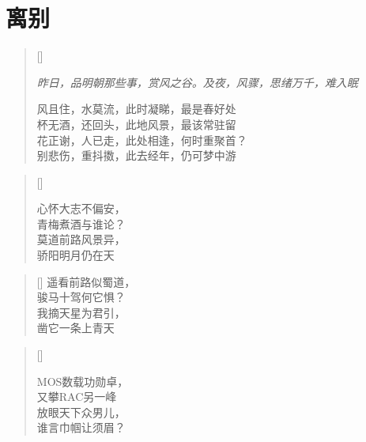 \chapter{离别}
\thispagestyle{empty}
\renewcommand{\poemtoc}{subsection}
\settowidth{\versewidth}{风且住，水莫流，此时凝睇，最是春好处}
\begin{verse}[\versewidth]

\emph{\small{昨日，品明朝那些事，赏风之谷。及夜，风骤，思绪万千，难入眠}}

风且住，水莫流，此时凝睇，最是春好处\\
杯无酒，还回头，此地风景，最该常驻留\\
花正谢，人已走，此处相逢，何时重聚首？\\
别悲伤，重抖擞，此去经年，仍可梦中游\\
\end{verse}

\renewcommand{\poemtoc}{subsection}
\settowidth{\versewidth}{心怀大志不偏安}
\begin{verse}[\versewidth]

心怀大志不偏安，\\
青梅煮酒与谁论？\\
莫道前路风景异，\\
骄阳明月仍在天
\end{verse}

\renewcommand{\poemtoc}{subsection}
\settowidth{\versewidth}{心怀大志不偏安}
\begin{verse}[\versewidth]
遥看前路似蜀道，\\
骏马十驾何它惧？\\
我摘天星为君引，\\
凿它一条上青天
\end{verse}

\renewcommand{\poemtoc}{subsection}
\settowidth{\versewidth}{MOS数载功勋卓}
\begin{verse}[\versewidth]

MOS数载功勋卓，\\
又攀RAC另一峰\\
放眼天下众男儿，\\
谁言巾帼让须眉？
\end{verse}
